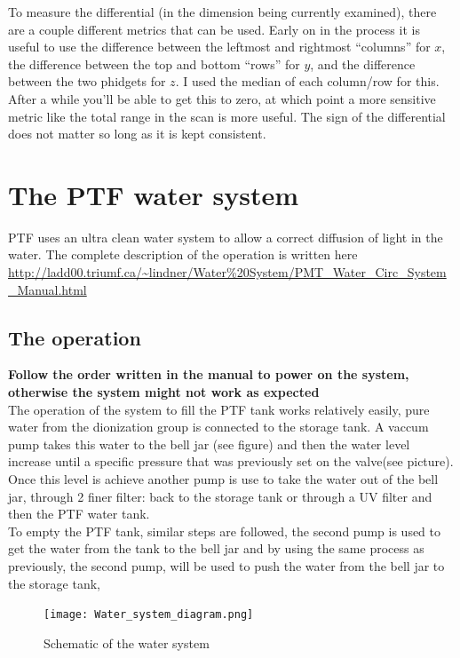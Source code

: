 \documentclass[twoside,letterpaper]{refart}
\begin{document}
To measure the differential (in the dimension being currently examined), there are a couple different metrics that can be used. Early on in the process it is useful to use the difference between the leftmost and rightmost ``columns'' for \(x\), the difference between the top and bottom ``rows'' for \(y\), and the difference between the two phidgets for \(z\). I used the median of each column/row for this. After a while you'll be able to get this to zero, at which point a more sensitive metric like the total range in the scan is more useful. The sign of the differential does not matter so long as it is kept consistent.


\clearpage

\section{The PTF water system}

PTF uses an ultra clean water system to allow a correct diffusion of light in the water. The complete description of the operation is written here \url{http://ladd00.triumf.ca/~lindner/Water%20System/PMT_Water_Circ_System_Manual.html}
\subsection{The operation }
\textbf{Follow the order written in the manual to power on the system, otherwise the system might not work as expected}\\

The operation of the system to fill the PTF tank works relatively easily, pure water from the dionization group is connected to the storage tank. A vaccum pump takes this water to the bell jar (see figure) and then the water level increase until a specific pressure that was previously set on the valve(see picture). Once this level is achieve another pump is use to take the water out of the bell jar, through 2 finer filter: back to the storage tank or through a UV filter and then the PTF water tank. \\

To empty the PTF tank, similar steps are followed, the second pump is used to get the water from the tank to the bell jar and by using the same process as previously, the second pump, will be used to push the water from the bell jar to the storage tank,
\FloatBarrier
\begin{figure}[!htb]\centering
	\texttt{[image: Water\_system\_diagram.png]}
  \caption{Schematic of the water system}
\end{figure}
\FloatBarrier
\end{document}
